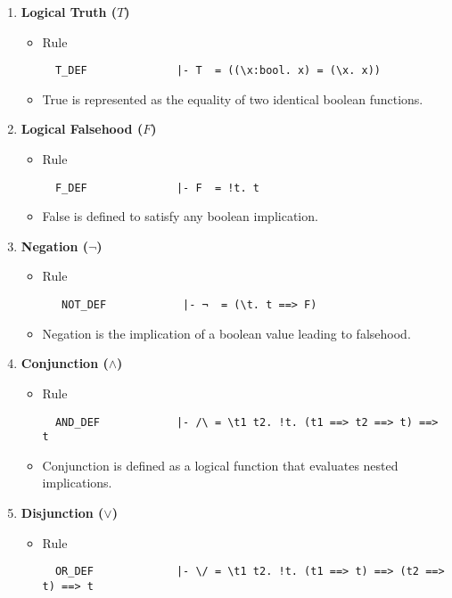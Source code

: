 \begin{enumerate}
    \item \textbf{Logical Truth (\(T\))}
    \begin{itemize}
        \item Rule
\begin{verbatim}
  T_DEF              |- T  = ((\x:bool. x) = (\x. x))

\end{verbatim}
        \item True is represented as the equality of two identical boolean functions.
    \end{itemize}

    \item \textbf{Logical Falsehood (\(F\))}
    \begin{itemize}
        \item Rule
\begin{verbatim}
  F_DEF              |- F  = !t. t
\end{verbatim}
        \item False is defined to satisfy any boolean implication.
    \end{itemize}

    \item \textbf{Negation (\(\neg\))}
    \begin{itemize}
        \item Rule
\begin{verbatim}
   NOT_DEF            |- ¬  = (\t. t ==> F)
\end{verbatim}
        \item Negation is the implication of a boolean value leading to falsehood.
    \end{itemize}

    \item \textbf{Conjunction (\(\wedge\))}
    \begin{itemize}
        \item Rule
\begin{verbatim}
  AND_DEF            |- /\ = \t1 t2. !t. (t1 ==> t2 ==> t) ==> t
\end{verbatim}
        \item Conjunction is defined as a logical function that evaluates nested implications.
    \end{itemize}

    \item \textbf{Disjunction (\(\vee\))}
    \begin{itemize}
        \item Rule
\begin{verbatim}
  OR_DEF             |- \/ = \t1 t2. !t. (t1 ==> t) ==> (t2 ==> t) ==> t


\end{verbatim}
\end{itemize}
\end{enumerate}
